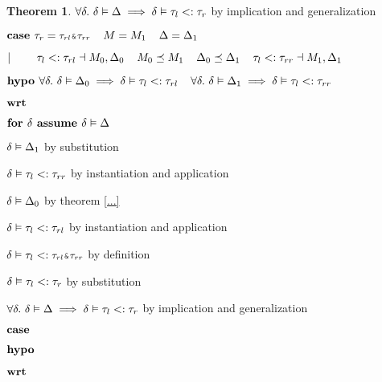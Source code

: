 \documentclass[acmsmall]{acmart}
\theoremstyle{definition}
\newtheorem{theorem}{Theorem}[section]
\begin{document}
\begin{theorem}
      \item \Z\Z $\forall \delta .\ \delta \vDash \Delta \implies \delta \vDash \tau_l <: \tau_r$ 
      by implication and generalization

    \item \Z $\B{case } 
      \tau_r = \J{$\tau_{rl}$\&$\tau_{rr}$}
      \I
      M = M_1
      \I
      \Delta = \Delta_1
    $
    \item \Z $|\ \ \ \ \ \ \  
      \tau_l <: \tau_{rl} \dashv M_0, \Delta_0
      \hspace{4mm}
      M_0 \preceq M_1
      \hspace{4mm}
      \Delta_0 \preceq \Delta_1
      \hspace{4mm}
      \tau_l <: \tau_{rr} \dashv M_1, \Delta_1
    $
    \item \Z $\textbf{hypo } 
      \forall \delta .\ \delta \vDash \Delta_0 \implies \delta \vDash \tau_l <: \tau_{rl} 
      \hspace{4mm}
      \forall \delta .\ \delta \vDash \Delta_1 \implies \delta \vDash \tau_l <: \tau_{rr} 
    $
    \item \Z $\textbf{wrt } $
      \item \Z\Z $\textbf{for } \delta \textbf{ assume } \delta \vDash \Delta$
        \item \Z\Z\Z $\delta \vDash \Delta_1 $ by substitution
        \item \Z\Z\Z $\delta \vDash \tau_l <: \tau_{rr}$ by instantiation and application 
        \item \Z\Z\Z $\delta \vDash \Delta_0 $ by theorem \ref{...}  
        \item \Z\Z\Z $\delta \vDash \tau_l <: \tau_{rl}$ by instantiation and application 
        \item \Z\Z\Z $\delta \satisfies \tau_l \subtypes \J{$\tau_{rl}$\&$\tau_{rr}$}$ by definition 
        \item \Z\Z\Z $\delta \vDash \tau_l <: \tau_r$ by substitution
      \item \Z\Z $\forall \delta .\ \delta \vDash \Delta \implies \delta \vDash \tau_l <: \tau_r$ 
      by implication and generalization


    \item \Z $\textbf{case } $
    \item \Z $\textbf{hypo } $
    \item \Z $\textbf{wrt } $
      \item \Z\Z {} 


\end{theorem}
\end{document}
